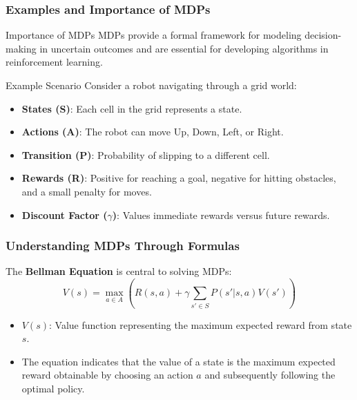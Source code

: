\documentclass[aspectratio=169]{beamer}
\begin{document}
\begin{frame}[fragile]
    \frametitle{Examples and Importance of MDPs}
    \begin{block}{Importance of MDPs}
        MDPs provide a formal framework for modeling decision-making in uncertain outcomes and are essential for developing algorithms in reinforcement learning.
    \end{block}

    \begin{block}{Example Scenario}
        Consider a robot navigating through a grid world:
        \begin{itemize}
            \item \textbf{States (S)}: Each cell in the grid represents a state.
            \item \textbf{Actions (A)}: The robot can move Up, Down, Left, or Right.
            \item \textbf{Transition (P)}: Probability of slipping to a different cell.
            \item \textbf{Rewards (R)}: Positive for reaching a goal, negative for hitting obstacles, and a small penalty for moves.
            \item \textbf{Discount Factor ($\gamma$)}: Values immediate rewards versus future rewards.
        \end{itemize}
    \end{block}
\end{frame}

\begin{frame}[fragile]
    \frametitle{Understanding MDPs Through Formulas}
    The \textbf{Bellman Equation} is central to solving MDPs:
    \begin{equation}
        V(s) = \max_{a \in A} \left( R(s, a) + \gamma \sum_{s' \in S} P(s'|s, a) V(s') \right)
    \end{equation}
    \begin{itemize}
        \item $V(s)$: Value function representing the maximum expected reward from state $s$.
        \item The equation indicates that the value of a state is the maximum expected reward obtainable by choosing an action $a$ and subsequently following the optimal policy.
    \end{itemize}
\end{frame}
\end{document}
